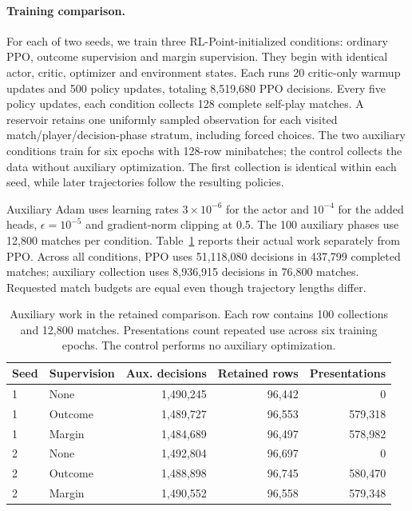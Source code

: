 \paragraph{Training comparison.}
For each of two seeds, we train three RL-Point-initialized conditions: ordinary
PPO, outcome supervision and margin supervision. They begin with identical
actor, critic, optimizer and environment states. Each runs 20 critic-only
warmup updates and 500 policy updates, totaling 8,519,680 PPO decisions. Every
five policy updates, each condition collects 128 complete self-play matches.
A reservoir retains one uniformly sampled observation for each visited
match/player/decision-phase stratum, including forced choices. The two auxiliary
conditions train for six epochs with 128-row minibatches; the control collects
the data without auxiliary optimization. The first collection is identical
within each seed, while later trajectories follow the resulting policies.

Auxiliary Adam uses learning rates $3\times10^{-6}$ for the actor and $10^{-4}$
for the added heads, $\epsilon=10^{-5}$ and gradient-norm clipping at 0.5.
The 100 auxiliary phases use 12,800 matches per condition. Table~\ref{tab:aux-work}
reports their actual work separately from PPO. Across all conditions, PPO uses
51,118,080 decisions in 437,799 completed matches; auxiliary collection uses
8,936,915 decisions in 76,800 matches. Requested match budgets are equal even
though trajectory lengths differ.

\begin{table}[t]
\centering
\small
\begin{tabular}{llrrr}
\toprule
Seed & Supervision & Aux. decisions & Retained rows & Presentations\\
\midrule
1 & None & 1,490,245 & 96,442 & 0\\
1 & Outcome & 1,489,727 & 96,553 & 579,318\\
1 & Margin & 1,484,689 & 96,497 & 578,982\\
2 & None & 1,492,804 & 96,697 & 0\\
2 & Outcome & 1,488,898 & 96,745 & 580,470\\
2 & Margin & 1,490,552 & 96,558 & 579,348\\
\bottomrule
\end{tabular}
\caption{Auxiliary work in the retained comparison. Each row contains 100
collections and 12,800 matches. Presentations count repeated use across six
training epochs. The control performs no auxiliary optimization.}
\label{tab:aux-work}
\end{table}

